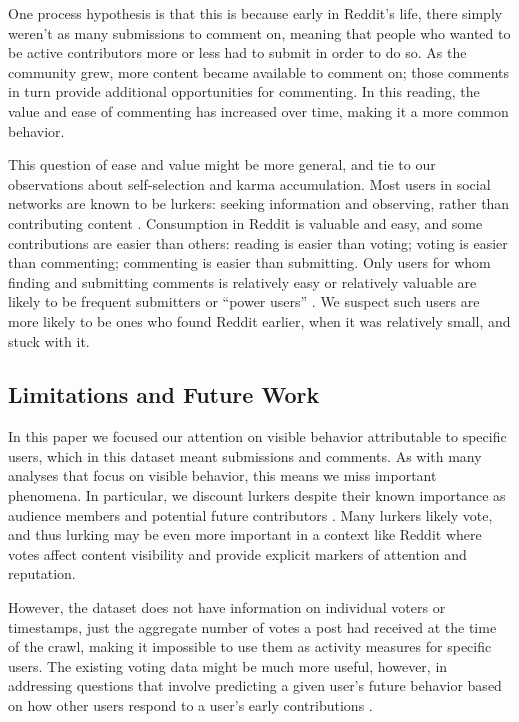 \documentclass[10pt, oneside, onecolumn]{article}
\begin{document}
One process hypothesis is that this is because early in Reddit's life, there simply weren't as many submissions to comment on, meaning that people who wanted to be active contributors more or less had to submit in order to do so. 
As the community grew, more content became available to comment on; those comments in turn provide additional opportunities for commenting.  In this reading, the value and ease of commenting has increased over time, making it a more common behavior. 

This question of ease and value might be more general, and tie to our observations about self-selection and karma accumulation.  Most users in social networks are known to be lurkers: seeking information and observing, rather than contributing content \cite{Rafaeli2004, Nonnecke2000}. Consumption in Reddit is valuable and easy, and some contributions are easier than others: reading is easier than voting; voting is easier than commenting; commenting is easier than submitting.  Only users for whom finding and submitting comments is relatively easy or relatively valuable are likely to be frequent submitters or ``power users'' \cite{Panciera2009, Kittur2007}. We suspect such users are more likely to be ones who found Reddit earlier, when it was relatively small, and stuck with it.

\subsection{Limitations and Future Work}

In this paper we focused our attention on visible behavior attributable to specific users, which in this dataset meant submissions and comments.  As with many analyses that focus on visible behavior, this means we miss important phenomena.  In particular, we discount lurkers despite their known importance as audience members \cite{Nonnecke2003} and potential future contributors \cite{Ridings2006}.  Many lurkers likely vote, and thus lurking may be even more important in a context like Reddit where votes affect content visibility and provide explicit markers of attention and reputation.  

However, the dataset does not have information on individual voters or timestamps, just the aggregate number of votes a post had received at the time of the crawl, making it impossible to use them as activity measures for specific users.  The existing voting data might be much more useful, however, in addressing questions that involve predicting a given user's future behavior based on how other users respond to a user's early contributions \cite{Joyce2006,Sarkar2012}.
\end{document}
